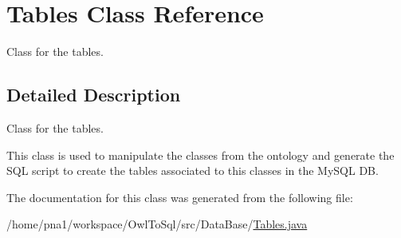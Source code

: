 \hypertarget{class_tables}{
\section{Tables Class Reference}
\label{class_tables}
}


Class for the tables.  




\subsection{Detailed Description}
Class for the tables. 

This class is used to manipulate the classes from the ontology and generate the SQL script to create the tables associated to this classes in the MySQL DB. 

The documentation for this class was generated from the following file:\begin{DoxyCompactItemize}
\item 
/home/pna1/workspace/OwlToSql/src/DataBase/\hyperlink{_tables_8java}{Tables.java}\end{DoxyCompactItemize}
